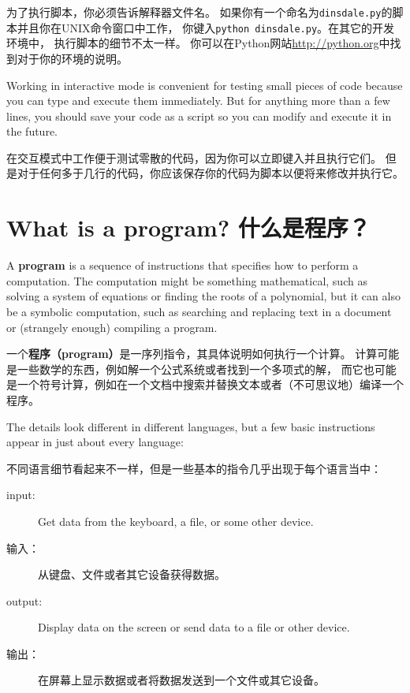 \documentclass[10pt]{book}
\begin{document}
\begin{CJK}{UTF8}{gbsn}
为了执行脚本，你必须告诉解释器文件名。
如果你有一个命名为{\tt dinsdale.py}的脚本并且你在UNIX命令窗口中工作，
你键入{\tt python dinsdale.py}。在其它的开发环境中，
执行脚本的细节不太一样。
你可以在Python网站\url{http://python.org}中找到对于你的环境的说明。

Working in interactive mode is convenient for testing small pieces of
code because you can type and execute them immediately.  But for
anything more than a few lines, you should save your code
as a script so you can modify and execute it in the future.

在交互模式中工作便于测试零散的代码，因为你可以立即键入并且执行它们。
但是对于任何多于几行的代码，你应该保存你的代码为脚本以便将来修改并执行它。

\section{What is a program? 什么是程序？}

A {\bf program} is a sequence of instructions that specifies how to
perform a computation.  The computation might be something
mathematical, such as solving a system of equations or finding the
roots of a polynomial, but it can also be a symbolic computation, such
as searching and replacing text in a document or (strangely enough)
compiling a program.

一个{\bf 程序（program）}是一序列指令，其具体说明如何执行一个计算。
计算可能是一些数学的东西，例如解一个公式系统或者找到一个多项式的解，
而它也可能是一个符号计算，例如在一个文档中搜索并替换文本或者（不可思议地）编译一个程序。

The details look different in different languages, but a few basic
instructions appear in just about every language:

不同语言细节看起来不一样，但是一些基本的指令几乎出现于每个语言当中：

\begin{description}

\item[input:] Get data from the keyboard, a file, or some
other device.

\item[输入：] 从键盘、文件或者其它设备获得数据。

\item[output:] Display data on the screen or send data to a
file or other device.

\item[输出：] 在屏幕上显示数据或者将数据发送到一个文件或其它设备。


\end{description}
\end{CJK}
\end{document}
